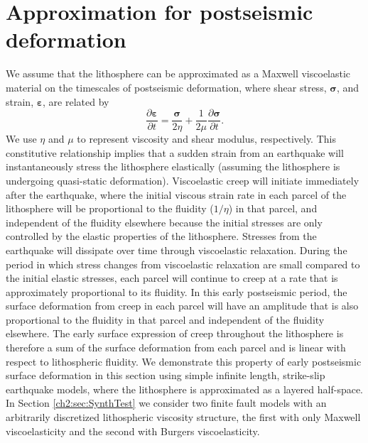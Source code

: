 \section{Approximation for postseismic deformation} 
We assume that the lithosphere can be approximated as a Maxwell
viscoelastic material on the timescales of postseismic deformation,
where shear stress, $\mathbf{\sigma}$, and strain,
$\mathbf{\varepsilon}$, are related by
\begin{equation}
\frac{\partial\mathbf{\varepsilon}}{\partial t} =
\frac{\mathbf{\sigma}}{2\eta} + 
\frac{1}{2\mu}\frac{\partial\mathbf{\sigma}}{\partial t}.
\end{equation}
We use $\eta$ and $\mu$ to represent viscosity and shear modulus,
respectively.  This constitutive relationship implies that a sudden
strain from an earthquake will instantaneously stress the lithosphere
elastically (assuming the lithosphere is undergoing quasi-static
deformation).  Viscoelastic creep will initiate immediately after the
earthquake, where the initial viscous strain rate in each parcel of
the lithosphere will be proportional to the fluidity ($1/\eta$) in
that parcel, and independent of the fluidity elsewhere because the
initial stresses are only controlled by the elastic properties of the
lithosphere.  Stresses from the earthquake will dissipate over time
through viscoelastic relaxation.  During the period in which stress
changes from viscoelastic relaxation are small compared to the initial
elastic stresses, each parcel will continue to creep at a rate that is
approximately proportional to its fluidity.  In this early postseismic
period, the surface deformation from creep in each parcel will have an
amplitude that is also proportional to the fluidity in that parcel and
independent of the fluidity elsewhere. The early surface expression of
creep throughout the lithosphere is therefore a sum of the surface
deformation from each parcel and is linear with respect to
lithospheric fluidity.  We demonstrate this property of early
postseismic surface deformation in this section using simple infinite
length, strike-slip earthquake models, where the lithosphere is
approximated as a layered half-space. In Section
\ref{ch2:sec:SynthTest} we consider two finite fault models with an
arbitrarily discretized lithospheric viscosity structure, the first
with only Maxwell viscoelasticity and the second with Burgers
viscoelasticity.

